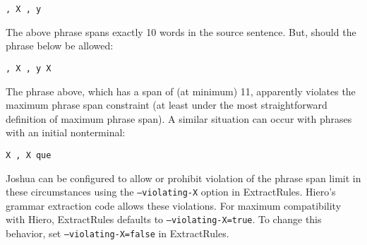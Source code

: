 \begin{verbatim}
, X , y
\end{verbatim}

The above phrase spans exactly 10 words in the source sentence. But, should the phrase below be allowed:

\begin{verbatim}
, X , y X
\end{verbatim}

The phrase above, which has a span of (at minimum) 11, apparently violates the maximum phrase span constraint (at least under the most straightforward definition of maximum phrase span). A similar situation can occur with phrases with an initial nonterminal:

\begin{verbatim}
X , X que
\end{verbatim}

Joshua can be configured to allow or prohibit violation of the phrase span limit in these circumstances using the {\tt --violating-X} option in ExtractRules. Hiero's grammar extraction code allows these violations. For maximum compatibility with Hiero, ExtractRules defaults to {\tt --violating-X=true}. To change this behavior, set {\tt --violating-X=false} in ExtractRules.

